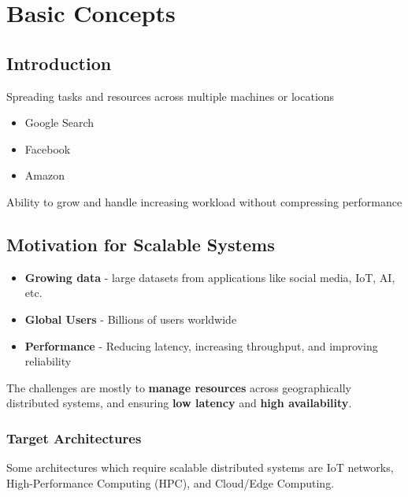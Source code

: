 \chapter{Basic Concepts}

\section{Introduction}
\begin{definition}[Distributed]
   Spreading tasks and resources across multiple machines or locations
\end{definition}

\begin{example}
   \begin{itemize}
      \item Google Search
      \item Facebook
      \item Amazon
   \end{itemize}
\end{example}

\begin{definition}[Scalable]
   Ability to grow and handle increasing workload without compressing performance
\end{definition}


\section{Motivation for Scalable Systems}
\begin{itemize}
   \item \textbf{Growing data} - large datasets from applications like social media, IoT, AI, etc.
   \item \textbf{Global Users} - Billions of users worldwide
   \item \textbf{Performance} - Reducing latency, increasing throughput, and improving reliability
\end{itemize}

The challenges are mostly to \textbf{manage resources} across geographically distributed systems, and ensuring \textbf{low latency} and \textbf{high availability}.

\subsection{Target Architectures}
Some architectures which require scalable distributed systems are IoT networks, High-Performance Computing (HPC), and Cloud/Edge Computing.

